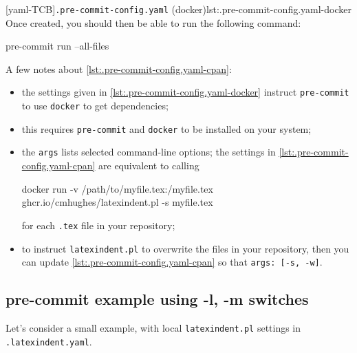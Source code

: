   [yaml-TCB]{\texttt{.pre-commit-config.yaml} (docker)}{lst:.pre-commit-config.yaml-docker}
  Once created, you should then be able to run the following command:
  \begin{commandshell}
pre-commit run --all-files
\end{commandshell}
  A few notes about \cref{lst:.pre-commit-config.yaml-cpan}:
  \begin{itemize}
   \item the settings given in \cref{lst:.pre-commit-config.yaml-docker} instruct
         \texttt{pre-commit} to use \texttt{docker} to get dependencies;
   \item this requires \texttt{pre-commit} and \texttt{docker} to be installed on your system;
   \item the \texttt{args} lists selected command-line options; the settings in
         \cref{lst:.pre-commit-config.yaml-cpan} are equivalent to calling
         \begin{commandshell}
docker run -v /path/to/myfile.tex:/myfile.tex ghcr.io/cmhughes/latexindent.pl -s myfile.tex
\end{commandshell}
         for each \texttt{.tex} file in your repository;
   \item to instruct \texttt{latexindent.pl} to overwrite the files in your repository, then you
         can update \cref{lst:.pre-commit-config.yaml-cpan} so that \texttt{args: [-s, -w]}.
  \end{itemize}

  \subsection{pre-commit example using -l, -m switches}
  Let's consider a small example, with local \texttt{latexindent.pl} settings in
  \texttt{.latexindent.yaml}.

